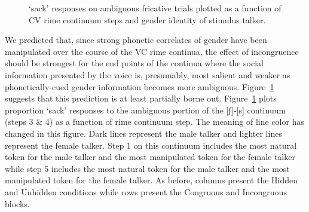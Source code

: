 \documentclass[
  letterpaper,
  DIV=11,
  numbers=noendperiod]{scrartcl}
\begin{document}
\begin{figure}


\caption{\label{fig-rimes}`sack' responses on ambiguous fricative trials
plotted as a function of CV rime continuum steps and gender identity of
stimulus talker.}

\end{figure}%

We predicted that, since strong phonetic correlates of gender have been
manipulated over the course of the VC rime continua, the effect of
incongruence should be strongest for the end points of the continua
where the social information presented by the voice is, presumably, most
salient and weaker as phonetically-cued gender information becomes more
ambiguous. Figure~\ref{fig-rimes} suggests that this prediction is at
least partially borne out. Figure~\ref{fig-rimes} plots proportion
`sack' responses to the ambiguous portion of the {[}ʃ{]}-{[}s{]}
continuum (steps 3 \& 4) as a function of rime continuum step. The
meaning of line color has changed in this figure. Dark lines represent
the male talker and lighter lines represent the female talker. Step 1 on
this continuum includes the most natural token for the male talker and
the most manipulated token for the female talker while step 5 includes
the most natural token for the male talker and the most manipulated
token for the female talker. As before, columns present the Hidden and
Unhidden conditions while rows present the Congruous and Incongruous
blocks.
\end{document}
